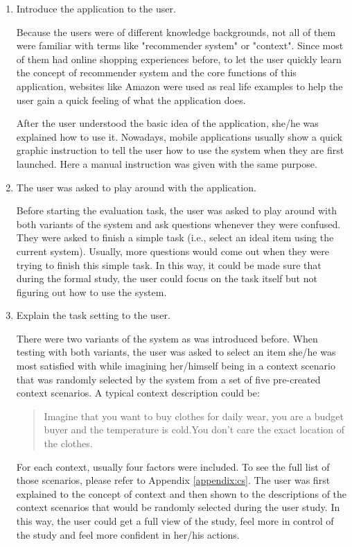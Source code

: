\begin{enumerate}
\item{Introduce the application to the user.}

Because the users were of different knowledge backgrounds, not all of them were familiar with terms like "recommender system" or "context". Since most of them had online shopping experiences before, to let the user quickly learn the concept of recommender system and the core functions of this application, websites like Amazon were used as real life examples to help the user gain a quick feeling of what the application does.

After the user understood the basic idea of the application, she/he was explained how to use it. Nowadays, mobile applications usually show a quick graphic instruction to tell the user how to use the system when they are first launched. Here a manual instruction was given with the same purpose.

\item{The user was asked to play around with the application.}

Before starting the evaluation task, the user was asked to play around with both variants of the system and ask questions whenever they were confused. They were asked to finish a simple task (i.e., select an ideal item using the current system). Usually, more questions would come out when they were trying to finish this simple task. In this way, it could be made sure that during the formal study, the user could focus on the task itself but not figuring out how to use the system.

\item{Explain the task setting to the user.}

There were two variants of the system as was introduced before. When testing with both variants, the user was asked to select an item she/he was most satisfied with while imagining her/himself being in a context scenario that was randomly selected by the system from a set of five pre-created context scenarios. A typical context description could be:

\blockquote{Imagine that you want to buy clothes for daily wear, you are a budget buyer and the temperature is cold.You don't care the exact location of the clothes.}

For each context, usually four factors were included. To see the full list of those scenarios, please refer to Appendix \ref{appendix:cs}. The user was first explained to the concept of context and then shown to the descriptions of the context scenarios that would be randomly selected during the user study. In this way, the user could get a full view of the study, feel more in control of the study and feel more confident in her/his actions.


\end{enumerate}
